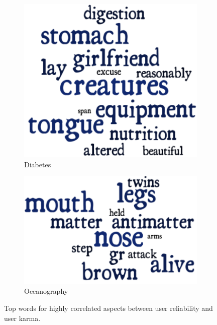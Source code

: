 \begin{figure}[h]
\begin{subfigure}{0.5\textwidth}
\includegraphics[scale=0.5]{images/Diabetes.pdf}
\caption{Diabetes}
\end{subfigure}
  \begin{subfigure}{0.5\textwidth}
  \centering
\includegraphics[scale=0.56]{images/Oceanography.pdf}
\caption{Oceanography}
\end{subfigure}
\caption{Top words for highly correlated aspects between user reliability and user karma.}
\label{fig:modelTopics}
\end{figure}

